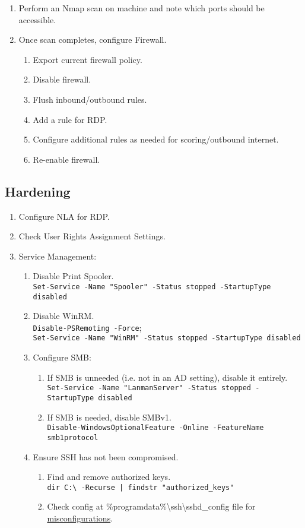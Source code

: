 \documentclass[12pt,letterpaper]{article}
\def\code#1{\textcolor{c2}{\texttt{#1}}}
\begin{document}
\begin{enumerate}
	\item Perform an Nmap scan on machine and note which ports should be accessible.
	\item Once scan completes, configure Firewall.
		\begin{enumerate}
			\item Export current firewall policy.
			\item Disable firewall.
			\item Flush inbound/outbound rules.
			\item Add a rule for RDP.
			\item Configure additional rules as needed for scoring/outbound internet.
			\item Re-enable firewall.
		\end{enumerate}
\end{enumerate}

\subsection{Hardening}

\begin{enumerate}
	\item Configure NLA for RDP.
	\item Check User Rights Assignment Settings.
	\item Service Management:
	\begin{enumerate}
		\item Disable Print Spooler. \\
			\code{Set-Service -Name "Spooler" -Status stopped -StartupType disabled}
		\item Disable WinRM. \\
			\code{Disable-PSRemoting -Force}; \\
			\code{Set-Service -Name "WinRM" -Status stopped -StartupType disabled}
		\item Configure SMB:
		\begin{enumerate}
			\item If SMB is unneeded (i.e. not in an AD setting), disable it entirely. \\
			\code{Set-Service -Name "LanmanServer" -Status stopped -StartupType disabled}
			\item If SMB is needed, disable SMBv1. \\
			\code{Disable-WindowsOptionalFeature -Online -FeatureName smb1protocol} 
		\end{enumerate}
		\item Ensure SSH has not been compromised.
		\begin{enumerate}
			\item Find and remove authorized keys. \\
				\code{dir C:\textbackslash{} -Recurse | findstr "authorized\_keys"}
			\item Check config at \%programdata\%\textbackslash{}ssh\textbackslash{}sshd\_config file for \href{https://learn.microsoft.com/en-us/windows-server/administration/openssh/openssh_server_configuration}{misconfigurations}. 
		\end{enumerate}
	\end{enumerate}
\end{enumerate}
\end{document}

